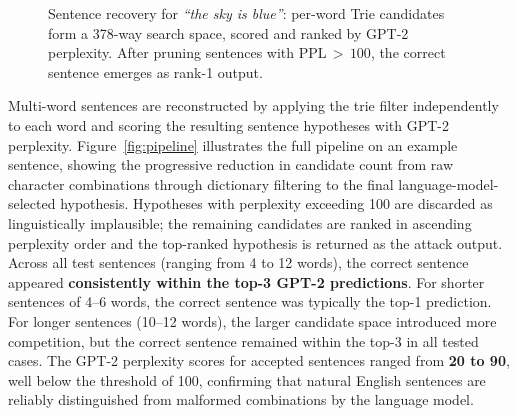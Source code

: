 \documentclass[conference]{IEEEtran}
\begin{document}
\begin{figure}[h]
\centering
{}
\caption{Sentence recovery for \textit{``the sky is blue''}: per-word Trie candidates form a 378-way search space, scored and ranked by GPT-2 perplexity. After pruning sentences with PPL\,$>\,100$, the correct sentence emerges as rank-1 output.}
\label{fig:sentrecov}
\end{figure}

Multi-word sentences are reconstructed by applying the trie filter
independently to each word and scoring the resulting sentence
hypotheses with GPT-2 perplexity.
Figure~\ref{fig:pipeline} illustrates the full pipeline on an
example sentence, showing the progressive reduction in candidate
count from raw character combinations through dictionary filtering
to the final language-model-selected hypothesis.
Hypotheses with perplexity exceeding 100 are discarded as
linguistically implausible; the remaining candidates are ranked
in ascending perplexity order and the top-ranked hypothesis is
returned as the attack output.
Across all test sentences (ranging from 4 to 12 words), the correct sentence appeared \textbf{consistently within the top-3 GPT-2 predictions}. For shorter sentences of 4--6 words, the correct sentence was typically the top-1 prediction. For longer sentences (10--12 words), the larger candidate space introduced more competition, but the correct sentence remained within the top-3 in all tested cases. The GPT-2 perplexity scores for accepted sentences ranged from \textbf{20 to 90}, well below the threshold of 100, confirming that natural English sentences are reliably distinguished from malformed combinations by the language model.
\end{document}
